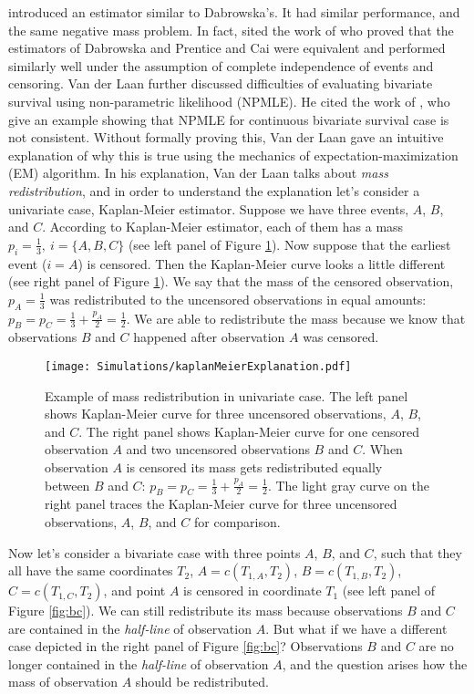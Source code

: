 \documentclass[]{article}
\begin{document}
\cite{prentice1992covariance} introduced an estimator similar to Dabrowska's. It had similar performance, and the same negative mass problem. In fact, \cite{van1997nonparametric} sited the work of \cite{gill1990survey} who proved that the estimators of Dabrowska and Prentice and Cai were equivalent and performed similarly well under the assumption of complete independence of events and censoring. Van der Laan further discussed difficulties of evaluating bivariate survival using non-parametric likelihood (NPMLE). He cited the work of \cite{tsai1986nonparametric}, who give an example showing that NPMLE for continuous bivariate survival case is not consistent. Without formally proving this, Van der Laan gave an intuitive explanation of why this is true using the mechanics of expectation-maximization (EM) algorithm. In his explanation, Van der Laan talks about \emph{mass redistribution}, and in order to understand the explanation let's consider a univariate case, Kaplan-Meier estimator. Suppose we have three events, $A$, $B$, and $C$. According to Kaplan-Meier estimator, each of them has a mass $p_i = \frac{1}{3},~i = \{A,B,C\}$ (see left panel of Figure \ref{fig:km}). Now suppose that the earliest event ($i=A$) is censored. Then the Kaplan-Meier curve looks a little different (see right panel of Figure \ref{fig:km}). We say that the mass of the censored observation, $p_A=\frac{1}{3}$ was redistributed to the uncensored observations in equal amounts: $p_B=p_C=\frac{1}{3}+\frac{p_A}{2} = \frac{1}{2}$. We are able to redistribute the mass because we know that observations $B$ and $C$ happened after observation $A$ was censored.\\

\begin{figure}[!h]
\caption[Example of mass redistribution in univariate case.]{Example of mass redistribution in univariate case. The left panel shows Kaplan-Meier curve for three uncensored observations, $A$, $B$, and $C$. The right panel shows Kaplan-Meier curve for one censored observation $A$ and two uncensored observations $B$ and $C$. When observation $A$ is censored its mass gets redistributed equally between $B$ and $C$: $p_B=p_C=\frac{1}{3}+\frac{p_A}{2} = \frac{1}{2}$. The light gray curve on the right panel traces the Kaplan-Meier curve for three uncensored observations, $A$, $B$, and $C$ for comparison.}
\texttt{[image: Simulations/kaplanMeierExplanation.pdf]}
\label{fig:km}
\end{figure}

Now let's consider a bivariate case with three points $A$, $B$, and $C$, such that they all have the same coordinates $T_2$, $A=c(T_{1,A}, T_2)$, $B=c(T_{1,B}, T_2)$, $C=c(T_{1,C}, T_2)$, and point $A$ is censored in coordinate $T_1$ (see left panel of Figure \ref{fig:bc}). We can still redistribute its mass because observations $B$ and $C$ are contained in the \emph{half-line} of observation $A$. But what if we have a different case depicted in the right panel of Figure \ref{fig:bc}? Observations $B$ and $C$ are no longer contained in the \emph{half-line} of observation $A$, and the question arises how the mass of observation $A$ should be redistributed. 
\end{document}
